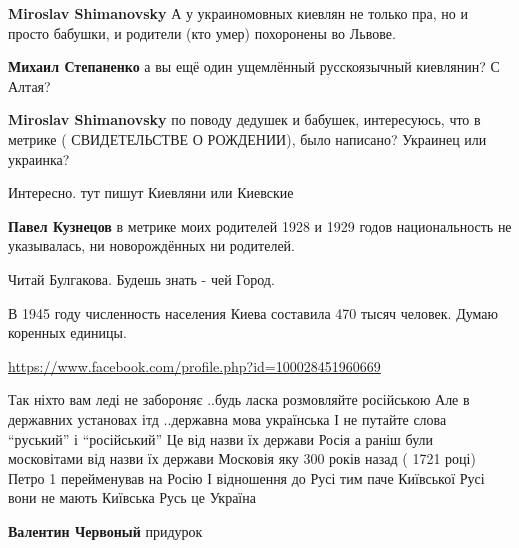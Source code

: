 \begin{itemize}
\begin{itemize}
\textbf{Miroslav Shimanovsky} А у украиномовных киевлян не только пра, но и просто бабушки, и родители (кто умер) похоронены во Львове.

\textbf{Михаил Степаненко} а вы ещё один ущемлённый русскоязычный киевлянин? С Алтая?

\textbf{Miroslav Shimanovsky} по поводу дедушек и бабушек, интересуюсь, что в метрике ( СВИДЕТЕЛЬСТВЕ О РОЖДЕНИИ), было написано? Украинец или украинка?

Интересно. тут пишут Киевляни или Киевские

\textbf{Павел Кузнецов} в метрике моих родителей 1928 и 1929 годов национальность не указывалась, ни новорождённых ни родителей.

Читай Булгакова. Будешь знать - чей Город.

В 1945 году численность населения Киева составила 470 тысяч человек. Думаю коренных единицы.


\end{itemize}

\url{https://www.facebook.com/profile.php?id=100028451960669}\par

Так ніхто вам леді не забороняє ..будь ласка розмовляйте російською Але в
державних установах ітд ..державна мова українська І не путайте слова \enquote{руський}
і \enquote{російський} Це від назви їх держави Росія а раніш були московітами від
назви їх держави Московія яку 300 років назад ( 1721 році) Петро 1 перейменував
на Росію І відношення до Русі тим паче Київської Русі вони не мають Київська
Русь це Україна

\begin{itemize}
\textbf{Валентин Червоный} придурок


\end{itemize}
\end{itemize}
